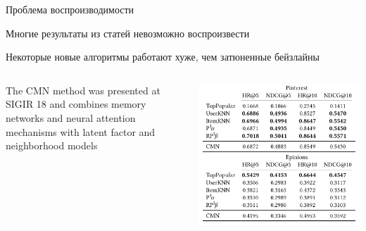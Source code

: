 \documentclass[11pt,aspectratio=169,handout]{beamer}
\begin{document}
\begin{frame}{Проблема воспроизводимости \cite{PROGRESS}}

\begin{tcolorbox}[colback=warn!5,colframe=warn!80,title=]
Многие результаты из статей невозможно воспроизвести
\end{tcolorbox}

\begin{tcolorbox}[colback=warn!5,colframe=warn!80,title=]
Некоторые новые алгоритмы работают хуже, чем затюненные бейзлайны
\end{tcolorbox}

\begin{columns}
\begin{column}{0.45\textwidth} 
\begin{tcolorbox}[colback=gray!5,colframe=gray!80,title=]
The CMN method was presented at SIGIR 18 and combines memory networks and neural attention mechanisms with latent factor and neighborhood models
\end{tcolorbox}
\end{column}
\begin{column}{0.45\textwidth}
\begin{center}
\includegraphics[scale=0.25]{images/progress.png}
\end{center}
\end{column}
\end{columns}

\end{frame}
\end{document}
